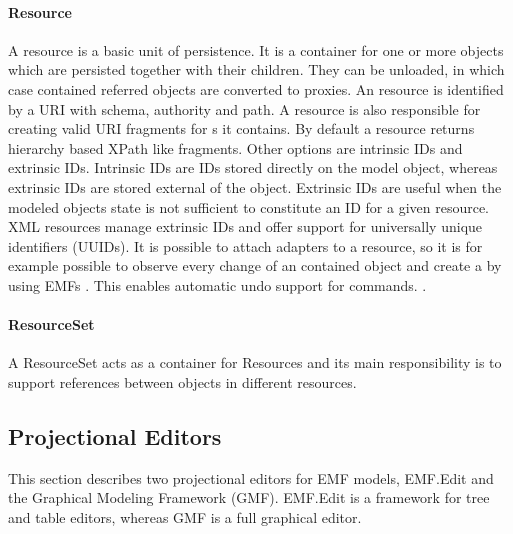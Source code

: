 \paragraph{Resource}
A resource is a basic unit of persistence. It is a container for one or more objects which are persisted together with their children. They can be unloaded, in which case contained referred objects  are converted to proxies. An resource is identified by a URI with schema, authority and path. A resource is also responsible for creating valid URI fragments for s it contains. By default a resource returns hierarchy based XPath like fragments. Other options are intrinsic IDs and extrinsic IDs. Intrinsic IDs are IDs stored directly on the model object, whereas extrinsic IDs are stored external of the object. Extrinsic IDs are useful when the modeled objects state is not sufficient to constitute an ID for a given resource. XML resources manage extrinsic IDs and offer support for universally unique identifiers (UUIDs). It is possible to attach adapters to a resource, so it is for example possible to observe every change of an contained object and create a  by using EMFs . This enables automatic undo support for commands. \cite{EMF2nd}.

\paragraph{ResourceSet}
A ResourceSet acts as a container for Resources and its main responsibility is to support references between objects in different resources. 

\subsection{Projectional Editors}
This section describes two projectional editors for EMF models, EMF.Edit and the Graphical Modeling Framework (GMF). EMF.Edit is a framework for tree and table editors, whereas GMF is a full graphical editor.

